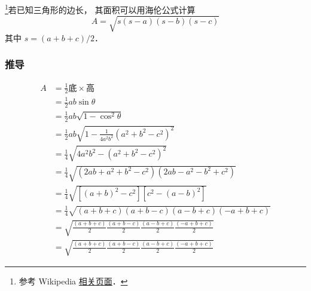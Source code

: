 
\footnote{参考 Wikipedia \href{https://en.wikipedia.org/wiki/Heron's_formula}{相关页面}．}若已知三角形的边长， 其面积可以用海伦公式计算
\begin{equation}
A = \sqrt{s(s-a)(s-b)(s-c)}
\end{equation}
其中 $s = (a+b+c)/2$．
\subsubsection{推导}
\begin{equation}
\begin{aligned}
A&=\frac{1}{2}\text{底}\times\text{高}\\
&=\frac{1}{2}ab\sin\theta\\
&=\frac{1}{2}ab\sqrt{1-\cos^2\theta}\\
&=\frac{1}{2}ab\sqrt{1-\frac{1}{4a^2b^2}(a^2+b^2-c^2)^2}\\
&=\frac{1}{4}\sqrt{4a^2b^2-(a^2+b^2-c^2)^2}\\
&=\frac{1}{4}\sqrt{(2ab+a^2+b^2-c^2)(2ab-a^2-b^2+c^2)}\\
&=\frac{1}{4}\sqrt{[(a+b)^2-c^2][c^2-(a-b)^2]}\\
&=\frac{1}{4}\sqrt{(a+b+c)(a+b-c)(a-b+c)(-a+b+c)}\\
&=\sqrt{\frac{(a+b+c)}{2}\frac{(a+b-c)}{2}\frac{(a-b+c)}{2}\frac{(-a+b+c)}{2}}\\
&=\sqrt{\frac{(a+b+c)}{2}\frac{(a+b-c)}{2}\frac{(a-b+c)}{2}\frac{(-a+b+c)}{2}}
\end{aligned}
\end{equation}
